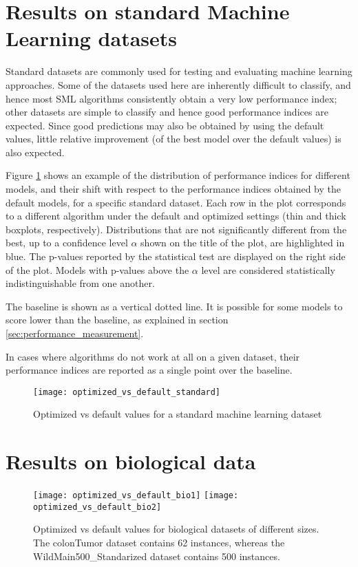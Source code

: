 \section{Results on standard Machine Learning datasets}

Standard datasets are commonly used for testing and evaluating machine learning approaches. Some of
the datasets used here are inherently difficult to classify, and hence most SML algorithms
consistently obtain a very low performance index; other datasets are simple to classify and hence
good performance indices are expected. Since good predictions may also be obtained by using the
default values, little relative improvement (of the best model over the default values) is also
expected.

Figure \ref{img:optvsdefstandard} shows an example of the distribution of performance indices for
different models, and their shift with respect to the performance indices obtained by the default
models, for a specific standard dataset. Each row in the plot corresponds to a different algorithm
under the default and optimized settings (thin and thick boxplots, respectively). Distributions that
are not significantly different from the best, up to a confidence level $\alpha$ shown on the title of the
plot, are highlighted in blue. The p-values reported by the statistical test are displayed on the right side
of the plot. Models with p-values above the $\alpha$ level are considered statistically
indistinguishable from one another.

The baseline is shown as a vertical dotted line. It is possible for some models to score lower than the
baseline, as explained in section \ref{sec:performance_measurement}.

In cases where algorithms do not work at all on a given dataset, their performance indices are
reported as a single point over the baseline.

\begin{figure}[t!]
	\centering
	\texttt{[image: optimized\_vs\_default\_standard]}
	\caption{Optimized vs default values for a standard machine learning dataset}
	\label{img:optvsdefstandard}
\end{figure}


\section{Results on biological data}

\begin{figure}[h!]
	\centering
	\texttt{[image: optimized\_vs\_default\_bio1]}
	\texttt{[image: optimized\_vs\_default\_bio2]}
	\caption[Optimized vs default values for biological datasets of different sizes]{Optimized vs
	default values for biological datasets of different sizes. The colonTumor dataset contains 62
	instances, whereas the WildMain500\_Standarized dataset contains 500 instances.}
	\label{img:optvsdefbio}
\end{figure}

